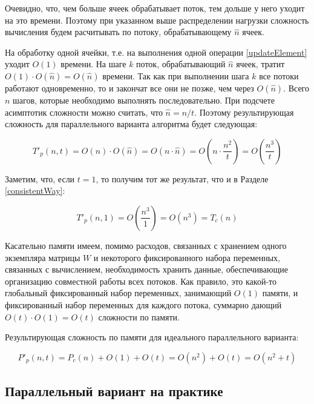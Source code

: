 \documentclass{article}
\begin{document}
			Очевидно, что, чем больше ячеек обрабатывает поток, тем дольше у него уходит на это времени. Поэтому при указанном выше распределении нагрузки сложность вычисления будем расчитывать по потоку, обрабатывающему $\hat n$ ячеек.
			
			На обработку одной ячейки, т.е. на выполнения одной операции \ref{updateElement} уходит $O(1)$ времени. На шаге $k$ поток, обрабатывающий $\hat n$ ячеек, тратит $O(1) \cdot O(\hat n) = O(\hat n)$ времени. Так как при выполнении шага $k$ все потоки работают одновременно, то и закончат все они не позже, чем через $O(\hat n)$. Всего $n$ шагов, которые необходимо выполнять последовательно. При подсчете асимптотик сложности можно считать, что $\hat n = n / t$. Поэтому результирующая сложность для параллельного варианта алгоритма будет следующая:
			
			\begin{equation} \label{parallelPerfectEquationDifficulty}
				T'_p(n,t) = O(n)  \cdot  O(\hat n) =
				O(n  \cdot  \hat n) =
				O\left( n \cdot \dfrac{n^2}{t} \right) =
				O\left( \dfrac{n^3}{t} \right)
			\end{equation}
			
			Заметим, что, если $t=1$, то получим тот же результат, что и в Разделе \ref{consistentWay}:
			
			$$
				T'_p(n,1) = O\left( \dfrac{n^3}{1} \right)
				= O(n^3) = T_c(n)
			$$
			
			Касательно памяти имеем, помимо расходов, связанных с хранением одного экземпляра матрицы $W$ и некоторого фиксированного набора переменных, связанных с вычислением, необходимость хранить данные, обеспечивающие организацию совместной работы всех потоков. Как правило, это какой-то глобальный фиксированный набор переменных, занимающий $O(1)$ памяти, и фиксированный набор переменных для каждого потока, суммарно дающий $O(t) \cdot O(1) = O(t)$ сложности по памяти.
			
			Результирующая сложность по памяти для идеального параллельного варианта:
			
			\begin{equation} \label{parallelPerfectMemoryDifficulty}
				P'_p(n,t) = P_c(n) + O(1) + O(t) = O(n^2) + O(t) = O(n^2+t)
			\end{equation}
		
			
		\subsection{Параллельный вариант на практике}
		
\end{document}
